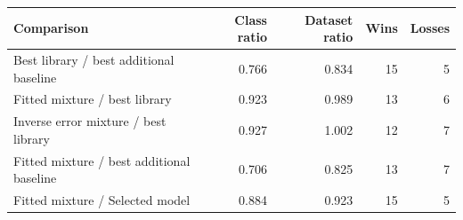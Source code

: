 \begin{tabular}{lrrrr}
\toprule
Comparison & Class ratio & Dataset ratio & Wins & Losses \\
\midrule
Best library / best additional baseline & 0.766 & 0.834 & 15 & 5 \\
Fitted mixture / best library & 0.923 & 0.989 & 13 & 6 \\
Inverse error mixture / best library & 0.927 & 1.002 & 12 & 7 \\
Fitted mixture / best additional baseline & 0.706 & 0.825 & 13 & 7 \\
Fitted mixture / Selected model & 0.884 & 0.923 & 15 & 5 \\
\bottomrule
\end{tabular}
